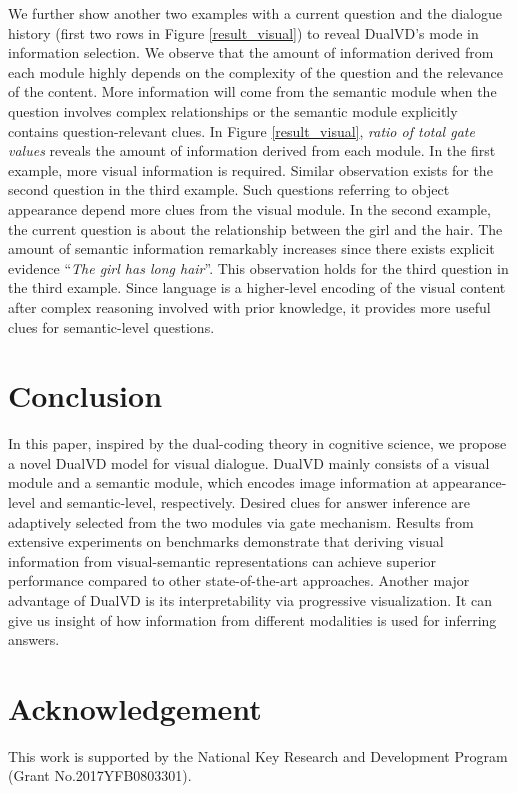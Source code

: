 \documentclass[letterpaper]{article} \usepackage{aaai20}  \usepackage{times}  \usepackage{helvet} \usepackage{courier}  \usepackage[hyphens]{url}  \usepackage{graphicx} \urlstyle{rm} \def\UrlFont{\rm}  \usepackage{graphicx}  \frenchspacing  \setlength{\pdfpagewidth}{8.5in}  \setlength{\pdfpageheight}{11in}  \usepackage{mathrsfs} \usepackage{amsfonts,amssymb}  \usepackage{tabularx} \usepackage{url}
\begin{document}
We further show another two examples with a current question and the dialogue history (first two rows in Figure \ref{result_visual}) to reveal DualVD's mode in information selection. We observe that the amount of information derived from each module highly depends on the complexity of the question and the relevance of the content. More information will come from the semantic module when the question involves complex relationships or the semantic module explicitly contains question-relevant clues. In Figure \ref{result_visual}, \textit{ratio of total gate values} reveals the amount of information derived from each module.  In the first example, more visual information is required. Similar observation exists for the second question in the third example. Such questions referring to object appearance depend more clues from the visual module. In the second example, the current question is about the relationship between the girl and the hair. The amount of semantic information remarkably increases since there exists explicit evidence ``\emph{The girl has long hair}''. This observation holds for the third question in the third example. Since language is a higher-level encoding of the visual content after complex reasoning involved with prior knowledge, it provides more useful clues for semantic-level questions.







\section{Conclusion}



In this paper, inspired by the dual-coding theory in cognitive science, we propose a novel DualVD model for visual dialogue. DualVD mainly consists of a visual module and a semantic module, which encodes image information at appearance-level and semantic-level, respectively. Desired clues for answer inference are adaptively selected from the two modules via gate mechanism. Results from extensive experiments on benchmarks demonstrate that deriving visual information from visual-semantic representations can achieve superior performance compared to other state-of-the-art approaches. Another major advantage of DualVD is its interpretability via progressive visualization. It can give us insight of how information from different modalities is used for inferring answers. 

\section{Acknowledgement}
This work is supported by the National Key Research and Development Program (Grant No.2017YFB0803301).









\end{document}

